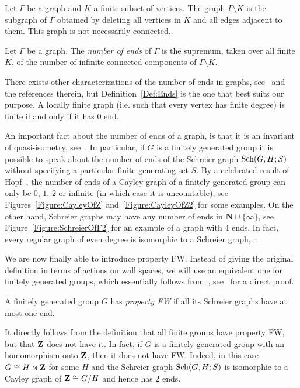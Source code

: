 Let $\Gamma$ be a graph and $K$ a finite subset of vertices. The graph $\Gamma\setminus K$ is the subgraph of $\Gamma$ obtained by deleting all vertices in $K$ and all edges adjacent to them. This graph is not necessarily connected.
\begin{defn}\label{Def:Ends}
Let $\Gamma$ be a graph. The \emph{number of ends} of $\Gamma$ is the supremum, taken over all finite $K$, of the number of infinite connected components of $\Gamma\setminus K$.
\end{defn}
There exists other characterizations of the number of ends in graphs, %
see~\cite{MR1967888} and the references therein, but Definition~\ref{Def:Ends} is the one that best suits our purpose.
A locally finite graph (i.e. such that every vertex has finite degree) is finite if and only if it has $0$ end.

An important fact about the number of ends of a graph, is that it is an invariant of quasi-isometry, see~\cite{MR1213151}. In particular, if $G$ is a finitely generated group it is possible to speak about the number of ends of the Schreier graph $\operatorname{Sch}(G,H;S)$ without specifying a particular finite generating set $S$.
By a celebrated result of Hopf~\cite{MR10267}, the number of ends of a Cayley graph of a finitely generated group can only be $0$, $1$, $2$ or infinite (in which case it is uncountable), see Figures~\ref{Figure:CayleyOfZ} and~\ref{Figure:CayleyOfZ2} for some examples.
On the other hand, Schreier graphs may have any number of ends in $\mathbf N\cup\{\infty\}$, see Figure~\ref{Figure:SchreierOfF2} for an example of a graph with $4$ ends.
In fact, every regular graph of even degree is isomorphic to a Schreier graph,~\cite{MR0450121,MR1358635}.

We are now finally able to introduce property FW. Instead of giving the original definition in terms of actions on wall spaces, we will use an equivalent one for finitely generated groups, which essentially follows from~\cite{MR1347406}, see~\cite{Cornulier2013} for a direct proof.
%
%
\begin{defn}
A finitely generated group $G$ has \emph{property FW} if all its Schreier graphs have at most one end.
\end{defn}
%
%
It directly follows from the definition that all finite groups have property FW, but that $\mathbf{Z}$ does not have it.
In fact, if $G$ is a finitely generated group with an homomorphism onto $\mathbf{Z}$, then it does not have FW. Indeed, in this case $G\cong H\rtimes \mathbf{Z}$  for some $H$ and the Schreier graph $\operatorname{Sch}(G,H;S)$ is isomorphic to a Cayley graph of $\mathbf{Z}\cong G/H$ and hence has $2$ ends.

